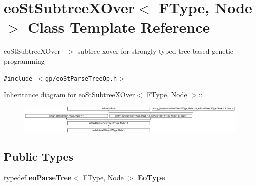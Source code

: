 \section{eo\-St\-Subtree\-XOver$<$ FType, Node $>$ Class Template Reference}
\label{classeo_st_subtree_x_over}
eo\-St\-Subtree\-XOver --$>$ subtree xover for strongly typed tree-based genetic programming  


{\tt \#include $<$gp/eo\-St\-Parse\-Tree\-Op.h$>$}

Inheritance diagram for eo\-St\-Subtree\-XOver$<$ FType, Node $>$::\begin{figure}[H]
\begin{center}
\leavevmode
\includegraphics[height=1.36752cm]{classeo_st_subtree_x_over}
\end{center}
\end{figure}
\subsection*{Public Types}
\begin{CompactItemize}
\item 
typedef {\bf eo\-Parse\-Tree}$<$ FType, Node $>$ {\bf Eo\-Type}\label{classeo_st_subtree_x_over_w0}

\end{CompactItemize}
